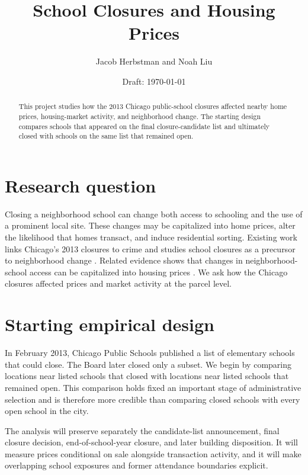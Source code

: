 \documentclass[11pt]{article}
\title{School Closures and Housing Prices}
\author{Jacob Herbstman and Noah Liu}
\date{Draft: \today}
\begin{document}
\maketitle

\begin{abstract}
This project studies how the 2013 Chicago public-school closures affected nearby home prices, housing-market activity, and neighborhood change. The starting design compares schools that appeared on the final closure-candidate list and ultimately closed with schools on the same list that remained open.
\end{abstract}

\section{Research question}

Closing a neighborhood school can change both access to schooling and the use of a prominent local site. These changes may be capitalized into home prices, alter the likelihood that homes transact, and induce residential sorting. Existing work links Chicago's 2013 closures to crime and studies school closures as a precursor to neighborhood change \cite{brazil2020schoolclosurescrime,pearman2022schoolclosuresgentrification}. Related evidence shows that changes in neighborhood-school access can be capitalized into housing prices \cite{hanidoux2025equilibrium}. We ask how the Chicago closures affected prices and market activity at the parcel level.

\section{Starting empirical design}

In February 2013, Chicago Public Schools published a list of elementary schools that could close. The Board later closed only a subset. We begin by comparing locations near listed schools that closed with locations near listed schools that remained open. This comparison holds fixed an important stage of administrative selection and is therefore more credible than comparing closed schools with every open school in the city.

The analysis will preserve separately the candidate-list announcement, final closure decision, end-of-school-year closure, and later building disposition. It will measure prices conditional on sale alongside transaction activity, and it will make overlapping school exposures and former attendance boundaries explicit.



\end{document}
